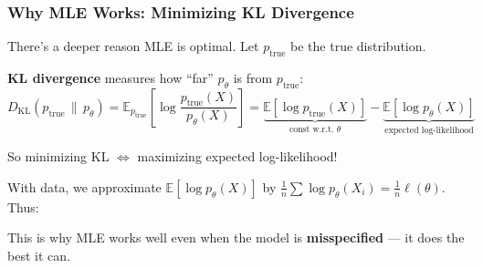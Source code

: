 \documentclass[aspectratio=169]{beamer}
\begin{document}
\begin{frame}
\frametitle{Why MLE Works: Minimizing KL Divergence}

\small
There's a deeper reason MLE is optimal. Let $p_{\text{true}}$ be the true distribution.

\vspace{0.15cm}
\textbf{KL divergence} measures how ``far'' $p_\theta$ is from $p_{\text{true}}$:
\vspace{-0.1cm}
$$D_{\text{KL}}(p_{\text{true}} \,\|\, p_\theta) = \mathbb{E}_{p_{\text{true}}}\!\left[\log\frac{p_{\text{true}}(X)}{p_\theta(X)}\right] = \underbrace{\mathbb{E}[\log p_{\text{true}}(X)]}_{\text{const w.r.t.\ }\theta} - \underbrace{\mathbb{E}[\log p_\theta(X)]}_{\text{expected log-likelihood}}$$

\vspace{-0.25cm}\pause
So minimizing KL $\Leftrightarrow$ maximizing expected log-likelihood!

\vspace{0.15cm}
With data, we approximate $\mathbb{E}[\log p_\theta(X)]$ by $\frac{1}{n}\sum \log p_\theta(X_i) = \frac{1}{n}\ell(\theta)$. Thus:

\vspace{0.1cm}
\begin{center}
\end{center}

\vspace{0.1cm}
\centering\small This is why MLE works well even when the model is \textbf{misspecified} --- it does the best it can.
\end{frame}
\end{document}
